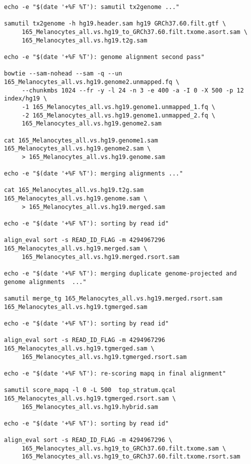 \documentclass[10pt]{article}
\begin{document}
{\begin{verbatim}
echo -e "$(date '+%F %T'): samutil tx2genome ..."

samutil tx2genome -h hg19.header.sam hg19 GRCh37.60.filt.gtf \
     165_Melanocytes_all.vs.hg19_to_GRCh37.60.filt.txome.asort.sam \
     165_Melanocytes_all.vs.hg19.t2g.sam

echo -e "$(date '+%F %T'): genome alignment second pass"

bowtie --sam-nohead --sam -q --un 165_Melanocytes_all.vs.hg19.genome2.unmapped.fq \
     --chunkmbs 1024 --fr -y -l 24 -n 3 -e 400 -a -I 0 -X 500 -p 12 index/hg19 \
     -1 165_Melanocytes_all.vs.hg19.genome1.unmapped_1.fq \
     -2 165_Melanocytes_all.vs.hg19.genome1.unmapped_2.fq \
     165_Melanocytes_all.vs.hg19.genome2.sam

cat 165_Melanocytes_all.vs.hg19.genome1.sam 165_Melanocytes_all.vs.hg19.genome2.sam \
     > 165_Melanocytes_all.vs.hg19.genome.sam

echo -e "$(date '+%F %T'): merging alignments ..."

cat 165_Melanocytes_all.vs.hg19.t2g.sam 165_Melanocytes_all.vs.hg19.genome.sam \
     > 165_Melanocytes_all.vs.hg19.merged.sam

echo -e "$(date '+%F %T'): sorting by read id"

align_eval sort -s READ_ID_FLAG -m 4294967296 165_Melanocytes_all.vs.hg19.merged.sam \
     165_Melanocytes_all.vs.hg19.merged.rsort.sam

echo -e "$(date '+%F %T'): merging duplicate genome-projected and genome alignments  ..."

samutil merge_tg 165_Melanocytes_all.vs.hg19.merged.rsort.sam 165_Melanocytes_all.vs.hg19.tgmerged.sam

echo -e "$(date '+%F %T'): sorting by read id"

align_eval sort -s READ_ID_FLAG -m 4294967296 165_Melanocytes_all.vs.hg19.tgmerged.sam \
     165_Melanocytes_all.vs.hg19.tgmerged.rsort.sam

echo -e "$(date '+%F %T'): re-scoring mapq in final alignment"

samutil score_mapq -l 0 -L 500  top_stratum.qcal 165_Melanocytes_all.vs.hg19.tgmerged.rsort.sam \
     165_Melanocytes_all.vs.hg19.hybrid.sam

echo -e "$(date '+%F %T'): sorting by read id"

align_eval sort -s READ_ID_FLAG -m 4294967296 \
     165_Melanocytes_all.vs.hg19_to_GRCh37.60.filt.txome.sam \
     165_Melanocytes_all.vs.hg19_to_GRCh37.60.filt.txome.rsort.sam


\end{verbatim}}
\end{document}

